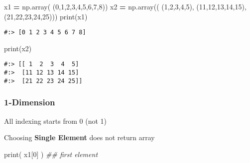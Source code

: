 \documentclass[
]{book}
\newenvironment{Shaded}{\begin{snugshade}}{\end{snugshade}}
\newcommand{\BuiltInTok}[1]{#1}
\newcommand{\CommentTok}[1]{\textcolor[rgb]{0.37,0.37,0.37}{\textit{#1}}}
\newcommand{\DecValTok}[1]{\textcolor[rgb]{0.06,0.06,0.06}{#1}}
\newcommand{\NormalTok}[1]{#1}
\newcommand{\OperatorTok}[1]{\textcolor[rgb]{0.43,0.43,0.43}{\textbf{#1}}}
\begin{document}
\begin{Shaded}
\begin{Highlighting}[]
\NormalTok{x1 }\OperatorTok{=}\NormalTok{ np.array( (}\DecValTok{0}\NormalTok{,}\DecValTok{1}\NormalTok{,}\DecValTok{2}\NormalTok{,}\DecValTok{3}\NormalTok{,}\DecValTok{4}\NormalTok{,}\DecValTok{5}\NormalTok{,}\DecValTok{6}\NormalTok{,}\DecValTok{7}\NormalTok{,}\DecValTok{8}\NormalTok{))}
\NormalTok{x2 }\OperatorTok{=}\NormalTok{ np.array(( (}\DecValTok{1}\NormalTok{,}\DecValTok{2}\NormalTok{,}\DecValTok{3}\NormalTok{,}\DecValTok{4}\NormalTok{,}\DecValTok{5}\NormalTok{), }
\NormalTok{      (}\DecValTok{11}\NormalTok{,}\DecValTok{12}\NormalTok{,}\DecValTok{13}\NormalTok{,}\DecValTok{14}\NormalTok{,}\DecValTok{15}\NormalTok{),}
\NormalTok{      (}\DecValTok{21}\NormalTok{,}\DecValTok{22}\NormalTok{,}\DecValTok{23}\NormalTok{,}\DecValTok{24}\NormalTok{,}\DecValTok{25}\NormalTok{)))}
\BuiltInTok{print}\NormalTok{(x1)}
\end{Highlighting}
\end{Shaded}

\begin{verbatim}
#:> [0 1 2 3 4 5 6 7 8]
\end{verbatim}

\begin{Shaded}
\begin{Highlighting}[]
\BuiltInTok{print}\NormalTok{(x2)}
\end{Highlighting}
\end{Shaded}

\begin{verbatim}
#:> [[ 1  2  3  4  5]
#:>  [11 12 13 14 15]
#:>  [21 22 23 24 25]]
\end{verbatim}

\hypertarget{dimension}{%
\subsubsection{1-Dimension}\label{dimension}}

All indexing starts from 0 (not 1)

Choosing \textbf{Single Element} does not return array

\begin{Shaded}
\begin{Highlighting}[]
\BuiltInTok{print}\NormalTok{( x1[}\DecValTok{0}\NormalTok{]   )  }\CommentTok{\#\# first element}
\end{Highlighting}
\end{Shaded}
\end{document}
